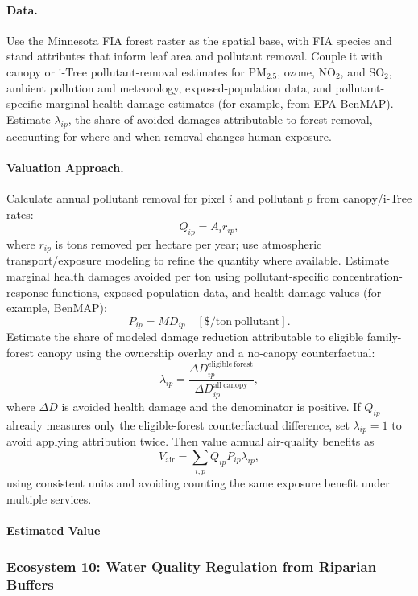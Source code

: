 \documentclass[11pt]{article}
\begin{document}
\paragraph{Data.}
Use the Minnesota FIA forest raster as the spatial base, with FIA species and stand attributes that inform leaf area and pollutant removal. Couple it with canopy or i-Tree pollutant-removal estimates for PM$_{2.5}$, ozone, NO$_2$, and SO$_2$, ambient pollution and meteorology, exposed-population data, and pollutant-specific marginal health-damage estimates (for example, from EPA BenMAP). Estimate $\lambda_{ip}$, the share of avoided damages attributable to forest removal, accounting for where and when removal changes human exposure.

\paragraph{Valuation Approach.}
Calculate annual pollutant removal for pixel $i$ and pollutant $p$ from canopy/i-Tree rates:
\[
Q_{ip}=A_i r_{ip},
\]
where $r_{ip}$ is tons removed per hectare per year; use atmospheric transport/exposure modeling to refine the quantity where available. Estimate marginal health damages avoided per ton using pollutant-specific concentration-response functions, exposed-population data, and health-damage values (for example, BenMAP):
\[
P_{ip}=MD_{ip}\quad [\$/\mathrm{ton\ pollutant}].
\]
Estimate the share of modeled damage reduction attributable to eligible family-forest canopy using the ownership overlay and a no-canopy counterfactual:
\[
\lambda_{ip}=\frac{\Delta D_{ip}^{\mathrm{eligible\ forest}}}{\Delta D_{ip}^{\mathrm{all\ canopy}}},
\]
where $\Delta D$ is avoided health damage and the denominator is positive. If $Q_{ip}$ already measures only the eligible-forest counterfactual difference, set $\lambda_{ip}=1$ to avoid applying attribution twice. Then value annual air-quality benefits as
\[
V_{\mathrm{air}}=\sum_{i,p} Q_{ip}P_{ip}\lambda_{ip},
\]
using consistent units and avoiding counting the same exposure benefit under multiple services.

\paragraph{Estimated Value}

\subsubsection{Ecosystem 10: Water Quality Regulation from Riparian Buffers}
\end{document}
